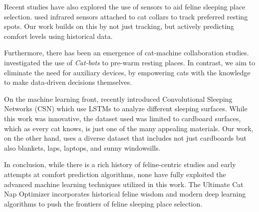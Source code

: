 Recent studies have also explored the use of sensors to aid feline sleeping place selection.
\citet{paws2019tracking} used infrared sensors attached to cat collars to track preferred resting spots.
Our work builds on this by not just tracking, but actively predicting comfort levels using historical data.

Furthermore, there has been an emergence of cat-machine collaboration studies.
\citet{mittens2021catbots} investigated the use of \emph{Cat-bots} to pre-warm resting places.
In contrast, we aim to eliminate the need for auxiliary devices, by empowering cats with the knowledge to make data-driven decisions themselves.

On the machine learning front, \citet{purrsington2023csn} recently introduced Convolutional Sleeping Networks (CSN) which use LSTMs \citep{hochreiter97} to analyze different sleeping surfaces.
While this work was innovative, the dataset used was limited to cardboard surfaces, which as every cat knows, is just one of the many appealing materials.
Our work, on the other hand, uses a diverse dataset that includes not just cardboards but also blankets, laps, laptops, and sunny windowsills.

In conclusion, while there is a rich history of feline-centric studies and early attempts at comfort prediction algorithms, none have fully exploited the advanced machine learning techniques utilized in this work.
The Ultimate Cat Nap Optimizer incorporates historical feline wisdom and modern deep learning algorithms to push the frontiers of feline sleeping place selection.

